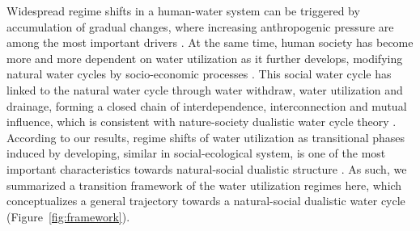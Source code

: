 \documentclass[9pt, twocolumn, twoside, lineno]{pnas-new}
\begin{document}
Widespread regime shifts in a human-water system can be triggered by accumulation of gradual changes, where increasing anthropogenic pressure are among the most important drivers \cite{rochaCascadingRegimeShifts2018a,falkenmarkUnderstandingWaterResilience2019}. 
At the same time, human society has become more and more dependent on water utilization as it further develops, modifying natural water cycles by socio-economic processes \cite{gleesonIlluminatingWaterCycle2020,dibaldassarreSociohydrologyScientificChallenges2019}.
This social water cycle has linked to the natural water cycle through water withdraw, water utilization and drainage, forming a closed chain of interdependence, interconnection and mutual influence, which is consistent with nature-society dualistic water cycle theory 
\cite{qinTheoreticalFrameworkDualistic2014,liuDualisticWaterCycle2010}.
According to our results, regime shifts of water utilization as transitional phases induced by developing, similar in social-ecological system, is one of the most important characteristics towards natural-social dualistic structure 
\cite{cummingImplicationsAgriculturalTransitions2014,cummingLinkingEconomicGrowth2018}.
As such, we summarized a transition framework of the water utilization regimes here, which conceptualizes a general trajectory towards a natural-social dualistic water cycle (Figure~\ref{fig:framework}).
\end{document}
